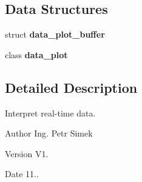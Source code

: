 \subsection*{Data Structures}
\begin{DoxyCompactItemize}
\item 
struct \textbf{ data\+\_\+plot\+\_\+buffer}
\item 
class \textbf{ data\+\_\+plot}
\end{DoxyCompactItemize}


\subsection{Detailed Description}
Interpret real-\/time data. 

\begin{DoxyAuthor}{Author}
Ing. Petr Simek 
\end{DoxyAuthor}
\begin{DoxyVersion}{Version}
V1. 
\end{DoxyVersion}
\begin{DoxyDate}{Date}
11.. 
\end{DoxyDate}
